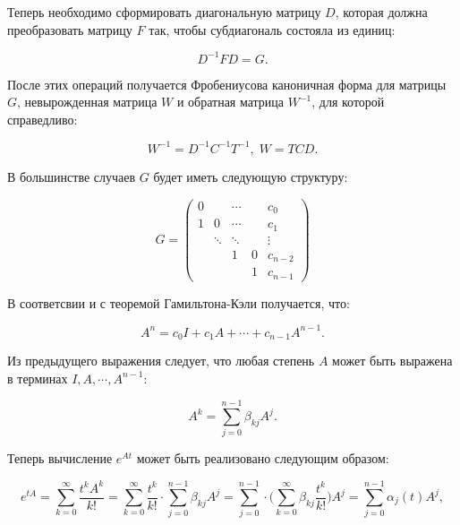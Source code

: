 \documentclass[master, och, diploma, times]{sty/SCWorks}
\theoremstyle{plain}
\theoremstyle{definition}
\numberwithin{equation}{section}
\begin{document}
\noindent Теперь необходимо сформировать диагональную матрицу $D$, которая должна преобразовать матрицу $F$ так, чтобы субдиагональ состояла из единиц:

\begin{equation}
D^{-1}FD=G.
\end{equation}

\noindent После этих операций получается Фробениусова каноничная форма \cite{bib:algebra:1} для матрицы $G$, невырожденная матрица $W$ и обратная матрица $W^{-1}$, для которой справедливо:

\begin{equation}
W^{-1}=D^{-1}C^{-1}T^{-1}, \; W=TCD.
\end{equation}

\noindent В большинстве случаев $G$ будет иметь следующую структуру:

\begin{equation}G=
\begin{pmatrix}
0 & & \cdots & & c_0\\
1 & 0 & \cdots & & c_1\\
& \ddots & \ddots & & \vdots \\
& & 1 & 0 & c_{n-2} \\
& & & 1 & c_{n-1}
\end{pmatrix}
\end{equation}

\noindent В соответсвии и с теоремой Гамильтона-Кэли \cite{bib:algebra:roitenberg} получается, что:

\begin{equation}
A^n=c_0I+c_1A+\cdots+c_{n-1}A^{n-1}.
\end{equation}

Из предыдущего выражения следует, что любая степень $A$ может быть выражена в терминах $I, A, \cdots, A^{n-1}$:

\begin{equation}
A^k=\sum\limits_{j=0}^{n-1} \beta_{kj}A^j.
\end{equation}


\noindent Теперь вычисление $e^{At}$ может быть реализовано следующим образом:


\begin{equation}
e^{tA}=\sum\limits_{k=0}^{\infty} \frac{t^kA^k}{k!}=\sum\limits_{k=0}^{\infty} \frac{t^k}{k!} \cdot \sum\limits_{j=0}^{n-1} \beta_{kj} A^j = \sum\limits_{j=0}^{n-1} \cdot \bigg(\sum\limits_{k=0}^{\infty} \beta_{kj} \frac{t^k}{k!} \bigg) A^j = \sum\limits_{j=0}^{n-1} \alpha_{j}(t)A^j,
\end{equation}
\end{document}
